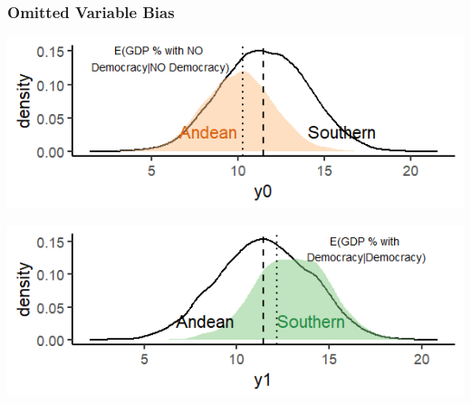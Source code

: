 \documentclass[xcolor=x11names,compress]{beamer}\usepackage[]{graphicx}\usepackage[]{color}
\makeatletter
\def\maxwidth{ %
  \ifdim\Gin@nat@width>\linewidth
    \linewidth
  \else
    \Gin@nat@width
  \fi
}
\newenvironment{knitrout}{}{} %
\renewcommand{\(}{\begin{columns}}
\renewcommand{\)}{\end{columns}}
\newcommand{\<}[1]{\begin{column}{#1}}
\renewcommand{\>}{\end{column}}
\makeatother
\begin{document}
\begin{frame}
\frametitle{Omitted Variable Bias}
\begin{knitrout}
\color{fgcolor}
\includegraphics[width=\maxwidth]{figure/OVB3-1} 

\end{knitrout}

\begin{knitrout}
\color{fgcolor}
\includegraphics[width=\maxwidth]{figure/OVB4-1} 

\end{knitrout}
\end{frame}
\end{document}

